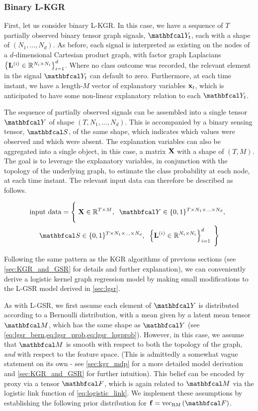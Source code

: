 \subsubsection{Binary L-KGR}

First, let us consider binary L-KGR. In this case, we have a sequence of $T$ partially observed binary tensor graph signals, $\Yt_t$, each with a shape of $(N_1, ..., N_d)$. As before, each signal is interpreted as existing on the nodes of a $d$-dimensional Cartesian product graph, with factor graph Laplacians $\left\{\mathbf{L}^{(i)} \in \mathbb{R}^{N_i \times N_i}\right\}_{i=1}^d$. Where no class outcome was recorded, the relevant element in the signal $\Yt_t$ can default to zero. Furthermore, at each time instant, we have a length-$M$ vector of explanatory variables $\mathbf{x}_t$, which is anticipated to have some non-linear explanatory relation to each $\Yt_t$.

The sequence of partially observed signals can be assembled into a single tensor $\Yt$ of shape $(T, N_1, ..., N_d)$. This is accompanied by a binary sensing tensor, $\St$, of the same shape, which indicates which values were observed and which were absent. The explanation variables can also be aggregated into a single object, in this case, a matrix $\mathbf{X}$ with a shape of $(T, M)$. The goal is to leverage the explanatory variables, in conjunction with the topology of the underlying graph, to estimate the class probability at each node, at each time instant. The relevant input data can therefore be described as follows. 


\begin{multline*}
    \text{input data} = \Bigg\{\;\X \in \R^{T \times M}, \;\; \Yt \in \{0, 1\}^{T \times N_1 \times ... \times N_d}, \;\; \\ 
    \St \in \{0, 1\}^{T \times N_1 \times ... \times N_d} , \;\; \left\{\LL^{(i)} \in \R^{N_i \times N_i}\right\}_{i=1}^d \; \Bigg\}
\end{multline*}

Following the same pattern as the KGR algorithms of previous sections (see \cref{sec:KGR_and_GSR} for details and further explanation), we can conveniently derive a logistic kernel graph regression model by making small modifications to the L-GSR model derived in \cref{sec:lgsr}.  

As with L-GSR, we first assume each element of $\Yt$ is distributed according to a Bernoulli distribution, with a mean given by a latent mean tensor $\Mt$, which has the same shape as $\Yt$ (see \cref{eq:lgsr_bern,eq:lgsr_prob,eq:lgsr_logprob}). However, in this case, we assume that $\Mt$ is smooth with respect to both the topology of the graph, \textit{and} with respect to the feature space. (This is admittedly a somewhat vague statement on its own - see \cref{sec:kgr_mdp} for a more detailed model derivation and \cref{sec:KGR_and_GSR} for further intuition). This belief can be encoded by proxy via a tensor $\Ft$, which is again related to $\Mt$ via the logistic link function of \cref{eq:logistic_link}. We implement these assumptions by establishing the following prior distribution for $\f = \vecrm{\Ft}$.

